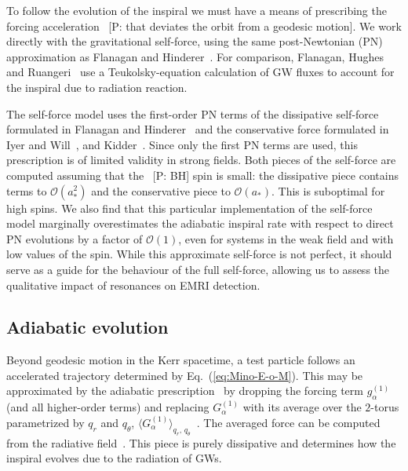 \documentclass[aps,prd,amsfonts,amssymb,amsmath,nofootinbib,showpacs,superscriptaddress,twocolumn,floatfix]{revtex4-1}
\newcommand{\eqnref}[1]{Eq.~(\ref{eq:#1})}
\newcommand{\order}[1]{\ensuremath{\mathcal{O}({#1})}}
\newcommand{\pcm}[1]{{\color{blue}~\textsf{[P: #1]}}}
\begin{document}
To follow the evolution of the inspiral we must have a means of prescribing the forcing acceleration \pcm{that deviates the orbit from a geodesic motion}. We work directly with the gravitational self-force, using the same post-Newtonian (PN) approximation as Flanagan and Hinderer~\cite{Flanagan2012}. For comparison, Flanagan, Hughes and Ruangeri~\cite{Flanagan2012a} use a Teukolsky-equation calculation of GW fluxes to account for the inspiral due to radiation reaction.

The self-force model uses the first-order PN terms of the dissipative self-force formulated in Flanagan and Hinderer~\cite{Flanagan2007} and the conservative force formulated in Iyer and Will~\cite{Iyer1993}, and Kidder~\cite{Kidder1995}. Since only the first PN terms are used, this prescription is of limited validity in strong fields. Both pieces of the self-force are computed assuming that the \pcm{BH} spin is small: the dissipative piece contains terms to $\order{a_\ast^2}$ and the conservative piece to $\order{a_\ast}$. This is suboptimal for high spins. We also find that this particular implementation of the self-force model marginally overestimates the adiabatic inspiral rate with respect to direct PN evolutions by a factor of $\mathcal{O}(1)$, even for systems in the weak field and with low values of the spin. While this approximate self-force is not perfect, it should serve as a guide for the behaviour of the full self-force, allowing us to assess the qualitative impact of resonances on EMRI detection.


\subsection{Adiabatic evolution}
\label{sec:adiabatic}

Beyond geodesic motion in the Kerr spacetime, a test particle follows an accelerated trajectory determined by \eqnref{Mino-E-o-M}. This may be approximated by the adiabatic prescription~\cite{Hinderer2008} by dropping the forcing term $g_\alpha^{(1)}$ (and all higher-order terms) and replacing $G_\alpha^{(1)}$ with its average over the $2$-torus parametrized by $q_r$ and $q_\theta$, $\langle G_\alpha^{(1)}\rangle_{q_r,\,q_\theta}$~\cite{Drasco2005,Grossman2011}. The averaged force can be computed from the radiative field~\cite{Galtsov1982,Mino2003,Sago2006,Ganz2007}. This piece is purely dissipative and determines how the inspiral evolves due to the radiation of GWs.
\end{document}
